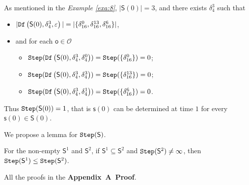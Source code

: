 \begin{example}\label{exa:9}
As mentioned in the {\em Example \ref{exa:8}}, $|\mathsf{S}(0)|=3$, and there exists $\delta_{4}^3$ such that 
 \begin{itemize}
 \item  $|{\tt Df}\left(\mathsf{S}(0),\delta_{4}^3,\varepsilon\right)|=|\{\delta_{16}^0,\delta_{16}^{13},\delta_{16}^6\}|$,
 \item   and for each $\mathsf{o}\in \mathcal{O}$
  \begin{itemize}
  \item   ${\tt Step}({\tt Df}\left(\mathsf{S}(0),\delta_{4}^3,\delta_{4}^0\right))={\tt Step}(\{\delta_{16}^0\})=0$;
 \item  ${\tt Step}({\tt Df}\left(\mathsf{S}(0),\delta_{4}^3,\delta_{4}^3\right))={\tt Step}(\{\delta_{16}^{13}\})=0$;
  \item  ${\tt Step}({\tt Df}\left(\mathsf{S}(0),\delta_{4}^3,\delta_{4}^1\right))={\tt Step}(\{\delta_{16}^{6}\})=0$.
 \end{itemize}
 \end{itemize}
Thus ${\tt Step}(\mathsf{S}(0))=1$, that is $\mathsf{s}(0)$ can be determined at time $1$ for every $\mathsf{s}(0)\in \mathsf{S}(0)$. 
\end{example}  

We propose a lemma for ${\tt Step}(\mathsf{S})$.

\begin{lemma}
For the non-empty $\mathsf{S}^{1}$ and $\mathsf{S}^{2}$, if $\mathsf{S}^{1}\subseteq\mathsf{S}^{2}$ and ${\tt Step}(\mathsf{S}^{2})\ne\infty$, then ${\tt Step}(\mathsf{S}^{1})\le{\tt Step}(\mathsf{S}^{2})$.%
  \label{lemm:1}
\end{lemma}

All the proofs in the {\bf Appendix~A~Proof}. 

